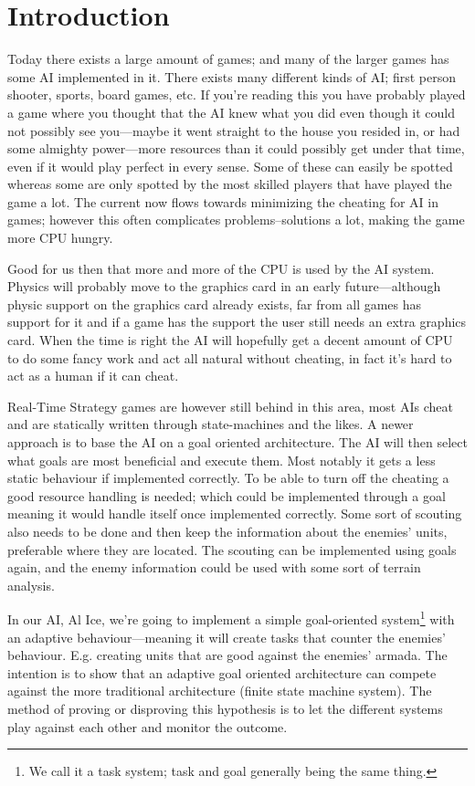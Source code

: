 \chapter[Introduction]{Introduction}
Today there exists a large amount of games; and many of the larger games has some AI implemented in
it. There exists many different kinds of AI; first person shooter, sports, board games, etc. If
you're reading this you have probably played a game where you thought that the AI knew what you did
even though it could not possibly see you---maybe it went straight to the house you resided in, or
had some almighty power---more resources than it could possibly get under that time, even if it
would play perfect in every sense. Some of these can easily be spotted whereas some are only
spotted by the most skilled players that have played the game a lot. The current now flows towards
minimizing the cheating for AI in games; however this often complicates problems--solutions a lot,
making the game more CPU hungry.

Good for us then that more and more of the CPU is used by the AI system. Physics will probably move
to the graphics card in an early future---although physic support on the graphics card already
exists, far from all games has support for it and if a game has the support the user still needs an
extra graphics card. When the time is right the AI will hopefully get a decent amount of CPU to do
some fancy work and act all natural without cheating, in fact it's hard to act as a human if it can
cheat.

Real-Time Strategy games are however still behind in this area, most AIs cheat and are statically
written through state-machines and the likes. A newer approach is to base the AI on a goal
oriented architecture. The AI will then select what goals are most beneficial and execute them.
Most notably it gets a less static behaviour if implemented correctly. To be able to turn off the
cheating a good resource handling is needed; which could be implemented through
a goal meaning it would handle itself once implemented correctly. Some sort of scouting also needs to be done and then
keep the information about the enemies' units, preferable where they are located. The scouting can
be implemented using goals again, and the enemy information could be used with some sort of terrain
analysis.


In our AI, Al Ice, we're going to implement a simple goal-oriented system\footnote{We call it a
task system; task and goal generally being the same thing.} with an adaptive behaviour---meaning it
will create tasks that counter the enemies' behaviour. E.g. creating units that are good
against the enemies' armada. The intention is to show that an adaptive goal
oriented architecture can compete against the more traditional architecture
(finite state machine system). The method of proving or disproving this
hypothesis is to let the different systems play against each other and
monitor the outcome. 
